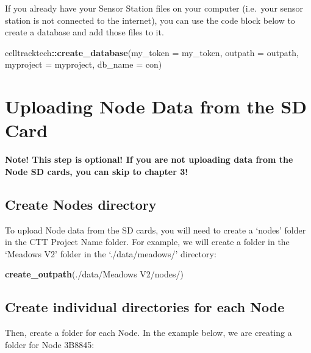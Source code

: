 \documentclass[
]{book}
\newenvironment{Shaded}{\begin{snugshade}}{\end{snugshade}}
\newcommand{\AttributeTok}[1]{\textcolor[rgb]{0.13,0.29,0.53}{#1}}
\newcommand{\FunctionTok}[1]{\textcolor[rgb]{0.13,0.29,0.53}{\textbf{#1}}}
\newcommand{\NormalTok}[1]{#1}
\newcommand{\SpecialCharTok}[1]{\textcolor[rgb]{0.81,0.36,0.00}{\textbf{#1}}}
\newcommand{\StringTok}[1]{\textcolor[rgb]{0.31,0.60,0.02}{#1}}
\begin{document}
If you already have your Sensor Station files on your computer (i.e.~your sensor station is not connected to the internet), you can use the code block below to create a database and add those files to it.

\begin{Shaded}
\begin{Highlighting}[]
\NormalTok{celltracktech}\SpecialCharTok{::}\FunctionTok{create\_database}\NormalTok{(}\AttributeTok{my\_token =}\NormalTok{ my\_token,}
                               \AttributeTok{outpath =}\NormalTok{ outpath,}
                               \AttributeTok{myproject =}\NormalTok{ myproject,}
                               \AttributeTok{db\_name =}\NormalTok{ con)}
\end{Highlighting}
\end{Shaded}

\section{Uploading Node Data from the SD Card}\label{uploading-node-data-from-the-sd-card}

\textbf{Note! This step is optional! If you are not uploading data from the Node SD cards, you can skip to chapter 3!}

\subsection{Create Nodes directory}\label{create-nodes-directory}

To upload Node data from the SD cards, you will need to create a `nodes' folder in the CTT Project Name folder. For example, we will create a folder in the `Meadows V2' folder in the `./data/meadows/' directory:

\begin{Shaded}
\begin{Highlighting}[]
\FunctionTok{create\_outpath}\NormalTok{(}\StringTok{\textquotesingle{}./data/Meadows V2/nodes/\textquotesingle{}}\NormalTok{)}
\end{Highlighting}
\end{Shaded}

\subsection{Create individual directories for each Node}\label{create-individual-directories-for-each-node}

Then, create a folder for each Node. In the example below, we are creating a folder for Node 3B8845:
\end{document}
